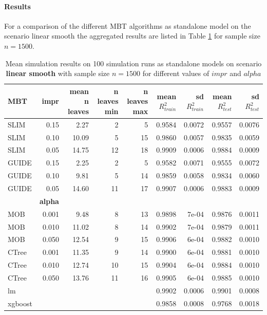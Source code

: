\paragraph{Results}
For a comparison of the different MBT algorithms as standalone model on the scenario linear smooth the aggregated results are listed in Table \ref{tab:linear_smooth_summary} for sample size $n = 1500$. 

\begin{table}[!htb] 
\centering \tiny
\begin{tabular}[t]{l|r|r|r|r|r|r|r|r}
\hline
MBT & \textbf{impr} & mean n leaves & n leaves min & n leaves max & mean $R^2_{train}$ & sd $R^2_{train}$ & mean $R^2_{test}$ & sd $R^2_{test}$\\
\hline
SLIM & 0.15 & 2.27 & 2 & 5 & 0.9584 & 0.0072 & 0.9557 & 0.0076\\
SLIM & 0.10 & 10.09 & 5 & 15 & 0.9860 & 0.0057 & 0.9835 & 0.0059\\
SLIM & 0.05 & 14.75 & 12 & 18 & 0.9909 & 0.0006 & 0.9884 & 0.0009\\
GUIDE & 0.15 & 2.25 & 2 & 5 & 0.9582 & 0.0071 & 0.9555 & 0.0072\\
GUIDE & 0.10 & 9.81 & 5 & 14 & 0.9859 & 0.0058 & 0.9834 & 0.0060\\
GUIDE & 0.05 & 14.60 & 11 & 17 & 0.9907 & 0.0006 & 0.9883 & 0.0009\\
\hline
 & \textbf{alpha} &  &  &  &  &  &  & \\
\hline
MOB & 0.001 & 9.48 & 8 & 13 & 0.9898 & 7e-04 & 0.9876 & 0.0011\\
MOB & 0.010 & 11.02 & 8 & 14 & 0.9902 & 7e-04 & 0.9879 & 0.0011\\
MOB & 0.050 & 12.54 & 9 & 15 & 0.9906 & 6e-04 & 0.9882 & 0.0010\\
CTree & 0.001 & 11.35 & 9 & 14 & 0.9900 & 6e-04 & 0.9881 & 0.0010\\
CTree & 0.010 & 12.74 & 10 & 15 & 0.9904 & 6e-04 & 0.9884 & 0.0010\\
CTree & 0.050 & 13.76 & 11 & 16 & 0.9905 & 6e-04 & 0.9885 & 0.0010\\
\hline
lm & & & & & 0.9902 & 0.0006 & 0.9901 & 0.0008\\
xgboost & & & & & 0.9858 & 0.0008 & 0.9768 & 0.0018\\
\hline
\end{tabular}
\caption{Mean simulation results on 100 simulation runs as standalone models on scenario \textbf{linear smooth} with sample size $n = 1500$ for different values of $impr$ and $alpha$}
\label{tab:linear_smooth_summary}
\end{table}


